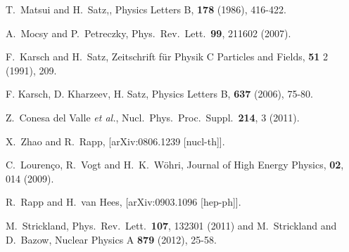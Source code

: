 \documentclass[article,showpacs,preprintnumbers,amsmath,amssymb]{revtex4}
\begin{document}
\begin{thebibliography}{80}

{{T.~{Matsui} and H.~{Satz},},
{Physics Letters B},
{\bf{178}}
(1986),
{416-422}.
}

A.~Mocsy and P.~Petreczky,
Phys.\ Rev.\ Lett.\  {\bf 99}, 211602 (2007).


F.~Karsch and H.~Satz,
Zeitschrift für Physik C Particles and Fields,
{\bf{51}} 2 (1991), 209.

{
F. Karsch, D. Kharzeev, H. Satz, 
Physics Letters B, 
{\bf{637}} (2006), 75-80. 
}


  Z.~Conesa del Valle {\it et al.},
  Nucl.\ Phys.\ Proc.\ Suppl.\  {\bf 214}, 3 (2011).

  X.~Zhao and R.~Rapp,
  [arXiv:0806.1239 [nucl-th]].

{
{C.~Louren\c{c}o, R.~Vogt and H.~K.~W{\"o}hri},
Journal of High Energy Physics,
{\bf{02}}, 014 (2009).
}

  R.~Rapp and H.~van Hees,
  [arXiv:0903.1096 [hep-ph]].

  M.~Strickland,
  Phys.\ Rev.\ Lett.\  {\bf 107}, 132301 (2011) and
  M.~Strickland and D.~Bazow,
  Nuclear Physics A {\bf{879}} (2012), 25-58.


\end{thebibliography}
\end{document}
